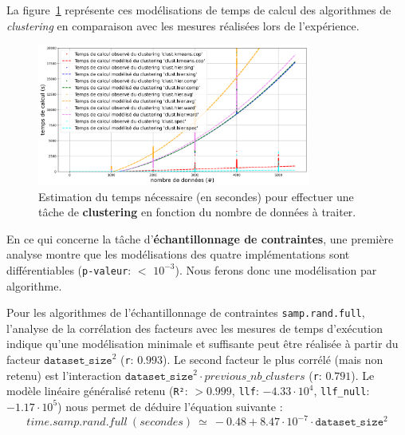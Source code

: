 			La figure~\ref{figure:4.3.2-ETUDE-COUTS-TEMPS-CALCUL-MODELISATION-CLUSTERING} représente ces modélisations de temps de calcul des algorithmes de \textit{clustering} en comparaison avec les mesures réalisées lors de l'expérience.
			\newline
			\begin{figure}[!htb]
				\centering
				\includegraphics[width=0.8\textwidth]{figures/etude-temps-calcul-modelisation-3clust}
				\caption{Estimation du temps nécessaire (en secondes) pour effectuer une tâche de \textbf{clustering} en fonction du nombre de données à traiter.}
				\label{figure:4.3.2-ETUDE-COUTS-TEMPS-CALCUL-MODELISATION-CLUSTERING}
			\end{figure}
			
			
			En ce qui concerne la tâche d'\textbf{échantillonnage de contraintes}, une première analyse montre que les modélisations des quatre implémentations sont différentiables  (\texttt{p-valeur}: $<$ \texttt{$10^{-3}$}). Nous ferons donc une modélisation par algorithme.
			
			Pour les algorithmes de l'échantillonnage de contraintes \texttt{samp.rand.full}, l'analyse de la corrélation des facteurs avec les mesures de temps d'exécution indique qu'une modélisation minimale et suffisante peut être réalisée à partir du facteur $\texttt{dataset\_size}^{2}$ (\texttt{r}: $0.993$).
			Le second facteur le plus corrélé (mais non retenu) est l'interaction $\texttt{dataset\_size}^{2} \cdot previous\_nb\_clusters$ (\texttt{r}: $0.791$).
			Le modèle linéaire généralisé retenu (\texttt{R²}: $> 0.999$, \texttt{llf}: $-4.33 \cdot 10^{4}$, \texttt{llf\_null}: $-1.17 \cdot 10^{5}$) nous permet de déduire l'équation suivante :
			\begin{equation}
				time.samp.rand.full~(secondes)~
				\simeq~-0.48 + 8.47 \cdot 10^{-7} \cdot \texttt{dataset\_size}^{2}
			\end{equation}
			
